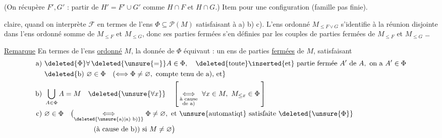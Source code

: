 
(On récupère $F',G'$ : partir de $H'=F'\cup G'$ comme $H\cap F$ et $H\cap G$.) Item pour une   configuration (famille pas  finie). 

  claire, quand on interprète $\mathcal F$ en termes de l'ens $\Phi\subseteq\mathcal P(M)$ satisfaisant à a) b) c). L'ens ordonné $M_{\leq F\vee G}$ s'identifie à la réunion disjointe dans l'ens ordonné somme de $M_{\leq F}$ et $M_{\leq G}$, donc ses parties fermées  s'en définies par les couples de parties fermées de $M_{\leq F}$ et $M_{\leq G}$ \ldots

\uline{Remarque}
En termes de l'ens \uline{ordonné} $M$, la donnée de $\Phi$ équivaut : un ens de parties \uline{fermées} de $M$, satisfaisant
\[
\begin{aligned}
\text{a) }&\deleted{\Phi}\forall\,\deleted{\unsure{=}}A\in\Phi,\quad
 \deleted{\text{toute}}\inserted{\text{et}}\ \text{partie fermée }A'\text{ de }A,\ \text{on a }A'\in\Phi\\
&\deleted{\text{b) }\varnothing\in\Phi\quad
 (\Longleftrightarrow\Phi\ne\varnothing,\ \text{compte tenu de a), et}}\\
\text{b) }&\bigcup_{A\in\Phi} A=M\quad\deleted{\unsure{\forall x}}\quad
 \left[\,\underset{\substack{\text{à cause}\\\text{de a)}}}{\Longleftrightarrow}\
 \forall x\in M,\ M_{\leq x}\in\Phi\,\right]\\
\text{c) }&\varnothing\in\Phi\quad
 \bigl(\underset{\deleted{\unsure{\text{a)}|\text{a) b)}}}}{\Longleftrightarrow}
 \Phi\ne\varnothing,\ \text{et \unsure{automatiqt} satisfaite}\ \deleted{\unsure{\Phi}}\\
 &\hspace{7em}\text{(à cause de b)) si }M\ne\varnothing\bigr)
\end{aligned}
\]


